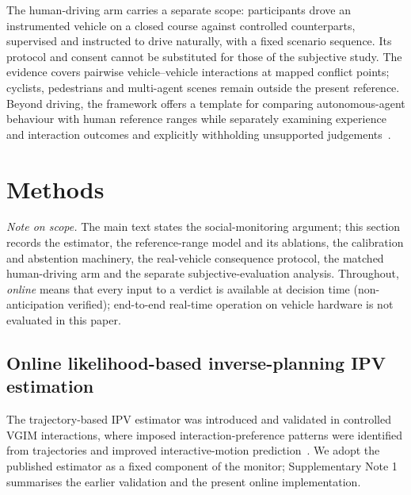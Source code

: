 \documentclass[12pt,a4paper]{article}
\begin{document}
The human-driving arm carries a separate scope: participants drove an instrumented vehicle on a
closed course against controlled counterparts, supervised and instructed to drive naturally, with a
fixed scenario sequence. Its protocol and consent cannot be substituted for those of the subjective
study. The evidence covers pairwise vehicle--vehicle interactions at mapped conflict points;
cyclists, pedestrians and multi-agent scenes remain outside the present reference. Beyond driving,
the framework offers a template for comparing autonomous-agent behaviour with human reference
ranges while separately examining experience and interaction outcomes and explicitly withholding
unsupported judgements~\cite{rahwan2019machine}.

\section{Methods}
\noindent\emph{Note on scope.} The main text states the social-monitoring argument; this section
records the estimator, the reference-range model and its ablations, the calibration and abstention
machinery, the real-vehicle consequence protocol, the matched human-driving arm and the separate
subjective-evaluation analysis. Throughout, \emph{online} means that every input to a
verdict is available at decision time (non-anticipation verified); end-to-end real-time operation on
vehicle hardware is not evaluated in this paper.

\subsection{Online likelihood-based inverse-planning IPV estimation}
The trajectory-based IPV estimator was introduced and validated in controlled VGIM interactions,
where imposed interaction-preference patterns were identified from trajectories and improved
interactive-motion prediction~\cite{zhao2024measuring}. We adopt the published estimator as a fixed
component of the monitor; Supplementary Note 1 summarises the earlier validation and the present
online implementation.
\end{document}
